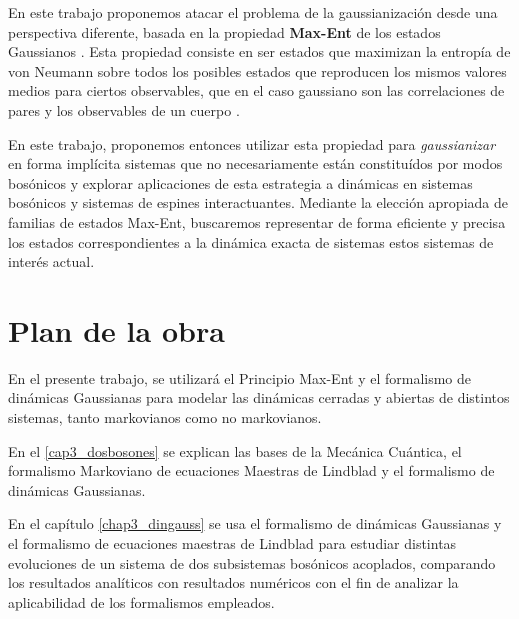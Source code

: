 \documentclass{report} %
\numberwithin{equation}{section}
\begin{document}
En este trabajo proponemos atacar el problema de la gaussianización desde una perspectiva diferente, basada en la propiedad \textbf{Max-Ent} de los estados Gaussianos \cite{Jaynes1, Jaynes2,RP.89,rossignoli1990extmf}. Esta propiedad consiste en ser estados que maximizan la entrop\'ia de von Neumann sobre todos los posibles estados que reproducen los mismos valores medios para ciertos observables, que en el caso gaussiano son las correlaciones de pares y los observables de un cuerpo \cite{Nielsen.00}.

En este trabajo, proponemos entonces utilizar esta propiedad para \emph{gaussianizar} en forma implícita sistemas que no necesariamente están constituídos por modos bosónicos
y explorar aplicaciones de esta estrategia a dinámicas en sistemas bosónicos y sistemas de espines interactuantes. Mediante la elección apropiada de familias de estados Max-Ent, buscaremos representar de forma eficiente y precisa los estados correspondientes a la dinámica exacta de sistemas estos sistemas de interés actual. 

\section*{Plan de la obra}


En el presente trabajo, se utilizará el Principio Max-Ent y el formalismo de dinámicas Gaussianas para modelar las dinámicas cerradas y abiertas de distintos sistemas, tanto markovianos como no markovianos.

En el \autoref{cap3_dosbosones} se explican las bases de la Mecánica Cuántica, el formalismo Markoviano de ecuaciones Maestras de Lindblad y el formalismo de dinámicas Gaussianas.

En el capítulo \autoref{chap3_dingauss} se usa el formalismo de dinámicas Gaussianas y el formalismo de ecuaciones maestras de Lindblad para estudiar distintas evoluciones de un sistema de dos subsistemas bosónicos acoplados, comparando los resultados analíticos con resultados numéricos con el fin de analizar la aplicabilidad de los formalismos empleados.
\end{document}
